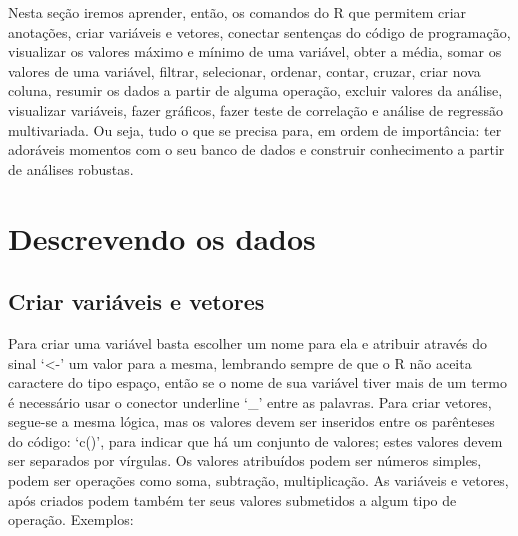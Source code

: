 \documentclass[
  brazil,
]{book}
\begin{document}
Nesta seção iremos aprender, então, os comandos do R que permitem criar anotações, criar variáveis e vetores, conectar sentenças do código de programação, visualizar os valores máximo e mínimo de uma variável, obter a média, somar os valores de uma variável, filtrar, selecionar, ordenar, contar, cruzar, criar nova coluna, resumir os dados a partir de alguma operação, excluir valores da análise, visualizar variáveis, fazer gráficos, fazer teste de correlação e análise de regressão multivariada. Ou seja, tudo o que se precisa para, em ordem de importância: ter adoráveis momentos com o seu banco de dados e construir conhecimento a partir de análises robustas.

\hypertarget{descrevendo-os-dados}{%
\section{Descrevendo os dados}\label{descrevendo-os-dados}}

\hypertarget{criar-variuxe1veis-e-vetores}{%
\subsection{Criar variáveis e vetores}\label{criar-variuxe1veis-e-vetores}}

Para criar uma variável basta escolher um nome para ela e atribuir através do sinal `\textless-' um valor para a mesma, lembrando sempre de que o R não aceita caractere do tipo espaço, então se o nome de sua variável tiver mais de um termo é necessário usar o conector underline `\_' entre as palavras. Para criar vetores, segue-se a mesma lógica, mas os valores devem ser inseridos entre os parênteses do código: `c()', para indicar que há um conjunto de valores; estes valores devem ser separados por vírgulas. Os valores atribuídos podem ser números simples, podem ser operações como soma, subtração, multiplicação. As variáveis e vetores, após criados podem também ter seus valores submetidos a algum tipo de operação. Exemplos:
\end{document}
